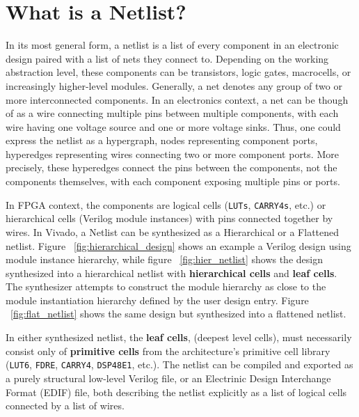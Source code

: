\section{What is a Netlist?}
\label{sec:netlist}
In its most general form, a netlist is a list of every component in an electronic design paired with a list of nets they connect to. 
Depending on the working abstraction level, these components can be transistors, logic gates, macrocells, or increasingly higher-level modules. 
Generally, a net denotes any group of two or more interconnected components.
In an electronics context, a net can be though of as a wire connecting multiple pins between multiple components, with each wire having one voltage source and one or more voltage sinks. 
Thus, one could express the netlist as a hypergraph, nodes representing component ports, hyperedges representing wires connecting two or more component ports. 
More precisely, these hyperedges connect the pins between the components, not the components themselves, with each component exposing multiple pins or ports. 

In FPGA context, the components are logical cells (\texttt{LUTs}, \texttt{CARRY4s}, etc.) or hierarchical cells (Verilog module instances) with pins connected together by wires. 
In Vivado, a Netlist can be synthesized as a Hierarchical or a Flattened netlist. 
Figure ~\ref{fig:hierarchical_design} shows an example a Verilog design using module instance hierarchy, while figure ~\ref{fig:hier_netlist} shows the design synthesized into a hierarchical netlist with \textbf{hierarchical cells} and \textbf{leaf cells}. 
The synthesizer attempts to construct the module hierarchy as close to the module instantiation hierarchy defined by the user design entry. 
Figure ~\ref{fig:flat_netlist} shows the same design but synthesized into a flattened netlist. 

In either synthesized netlist, the \textbf{leaf cells}, (deepest level cells), must necessarily consist only of \textbf{primitive cells} from the architecture's primitive cell library (\texttt{LUT6}, \texttt{FDRE}, \texttt{CARRY4}, \texttt{DSP48E1}, etc.). 
The netlist can be compiled and exported as a purely structural low-level Verilog file, or an Electrinic Design Interchange Format (EDIF) file, both describing the netlist explicitly as a list of logical cells connected by a list of wires. 

